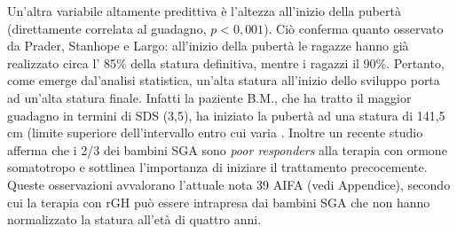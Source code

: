 Un'altra variabile altamente predittiva è l'altezza all'inizio della pubertà (direttamente correlata al guadagno, $p < 0,001$). Ciò conferma quanto osservato da Prader, Stanhope e Largo: 
 all'inizio della pubertà le ragazze hanno già realizzato circa l' 85\% della statura definitiva, mentre i ragazzi il 90\%. Pertanto, come emerge dal'analisi statistica, un'alta statura all'inizio dello sviluppo porta ad un'alta statura finale. Infatti la paziente B.M., che ha tratto il maggior guadagno in termini di SDS (3,5), ha iniziato la pubertà ad una statura di 141,5 cm (limite superiore dell'intervallo entro cui varia . Inoltre un recente studio afferma che i 2/3 dei bambini SGA sono \textit{poor responders} alla terapia con ormone somatotropo e sottlinea l'importanza di iniziare il trattamento precocemente.%
Queste osservazioni avvalorano l'attuale nota 39 AIFA (vedi Appendice), secondo cui la terapia con rGH può essere intrapresa dai bambini SGA che non hanno normalizzato la statura all'età di quattro anni.


  